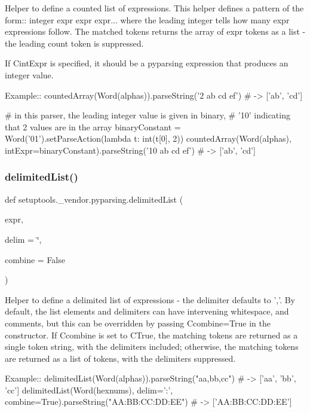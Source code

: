 \begin{DoxyVerb}Helper to define a counted list of expressions.
This helper defines a pattern of the form::
    integer expr expr expr...
where the leading integer tells how many expr expressions follow.
The matched tokens returns the array of expr tokens as a list - the leading count token is suppressed.

If C{intExpr} is specified, it should be a pyparsing expression that produces an integer value.

Example::
    countedArray(Word(alphas)).parseString('2 ab cd ef')  # -> ['ab', 'cd']

    # in this parser, the leading integer value is given in binary,
    # '10' indicating that 2 values are in the array
    binaryConstant = Word('01').setParseAction(lambda t: int(t[0], 2))
    countedArray(Word(alphas), intExpr=binaryConstant).parseString('10 ab cd ef')  # -> ['ab', 'cd']
\end{DoxyVerb}
 \mbox{\label{namespacesetuptools_1_1__vendor_1_1pyparsing_a1989367af98a82b6d6b4860de6b9f2f1}} 
\subsubsection{\texorpdfstring{delimited\+List()}{delimitedList()}}
{\footnotesize\ttfamily def setuptools.\+\_\+vendor.\+pyparsing.\+delimited\+List (\begin{DoxyParamCaption}\item[{}]{expr,  }\item[{}]{delim = {\ttfamily \char`\"{}},  }\item[{}]{combine = {\ttfamily False} }\end{DoxyParamCaption})}

\begin{DoxyVerb}Helper to define a delimited list of expressions - the delimiter defaults to ','.
By default, the list elements and delimiters can have intervening whitespace, and
comments, but this can be overridden by passing C{combine=True} in the constructor.
If C{combine} is set to C{True}, the matching tokens are returned as a single token
string, with the delimiters included; otherwise, the matching tokens are returned
as a list of tokens, with the delimiters suppressed.

Example::
    delimitedList(Word(alphas)).parseString("aa,bb,cc") # -> ['aa', 'bb', 'cc']
    delimitedList(Word(hexnums), delim=':', combine=True).parseString("AA:BB:CC:DD:EE") # -> ['AA:BB:CC:DD:EE']
\end{DoxyVerb}
 \mbox{\label{namespacesetuptools_1_1__vendor_1_1pyparsing_aa44c382b31b67ce7b69b0999b4c7ed70}} 
